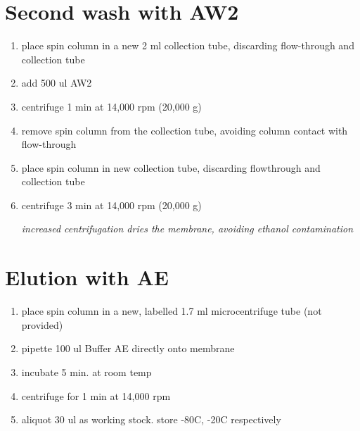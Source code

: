 \documentclass{article}
\begin{document}
\section*{Second wash with AW2}
\begin{enumerate}
    \item place spin column in a new 2 ml collection tube, discarding flow-through and collection tube
    \item add 500 ul AW2
    \item centrifuge 1 min at 14,000 rpm (20,000 g)
    \item remove spin column from the collection tube, avoiding column contact with flow-through
    \item place spin column in new collection tube, discarding flowthrough and collection tube
    \item centrifuge 3 min at 14,000 rpm (20,000 g)
    \begin{center}
    \emph{increased centrifugation dries the membrane, avoiding ethanol contamination}
    \end{center}
\end{enumerate}

\section*{Elution with AE}
\begin{enumerate}
    \item place spin column in a new, labelled 1.7 ml microcentrifuge tube (not provided)
    \item pipette 100 ul Buffer AE directly onto membrane
    \item incubate 5 min. at room temp
    \item centrifuge for 1 min at 14,000 rpm
    \item aliquot 30 ul as working stock. store -80C, -20C respectively
\end{enumerate}
\end{document}
